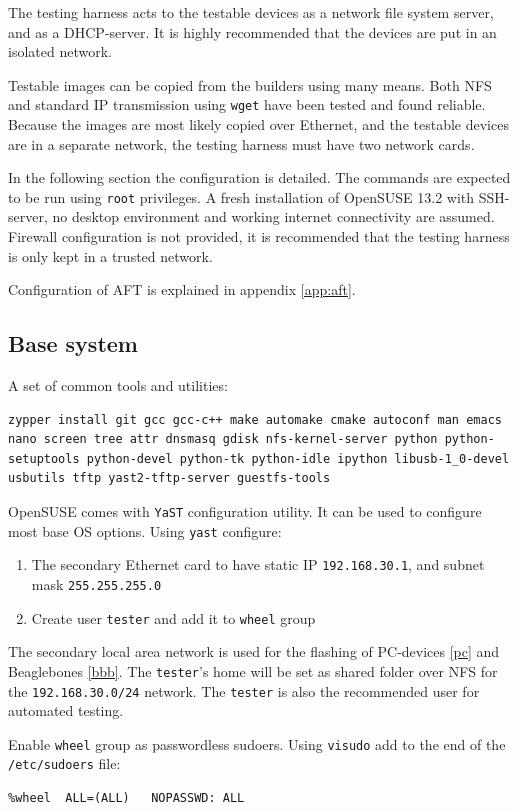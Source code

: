 \documentclass[a4paper,11pt]{article}
\newcommand{\cmd}[1]{\texttt{#1}}
\begin{document}
The testing harness acts to the testable devices as a network file system server, and as a DHCP-server. It is highly recommended that the devices are put in an isolated network.

Testable images can be copied from the builders using many means. Both NFS and standard IP transmission using \cmd{wget} have been tested and found reliable. Because the images are most likely copied over Ethernet, and the testable devices are in a separate network, the testing harness must have two network cards.

In the following section the configuration is detailed. The commands are expected to be run using \cmd{root} privileges. A fresh installation of OpenSUSE 13.2 with SSH-server, no desktop environment and working internet connectivity are assumed. Firewall configuration is not provided, it is recommended that the testing harness is only kept in a trusted network.

Configuration of AFT is explained in appendix \ref{app:aft}.

\subsection*{Base system}
A set of common tools and utilities:
\begin{lstlisting}
zypper install git gcc gcc-c++ make automake cmake autoconf man emacs nano screen tree attr dnsmasq gdisk nfs-kernel-server python python-setuptools python-devel python-tk python-idle ipython libusb-1_0-devel usbutils tftp yast2-tftp-server guestfs-tools
\end{lstlisting}


OpenSUSE comes with \cmd{YaST} configuration utility. It can be used to configure most base OS options. Using \cmd{yast} configure:
\begin{enumerate}
\item The secondary Ethernet card to have static IP \cmd{192.168.30.1}, and subnet mask \cmd{255.255.255.0}
\item Create user \cmd{tester} and add it to \cmd{wheel} group
\end{enumerate}
The secondary local area network is used for the flashing of PC-devices  \ref{pc} and Beaglebones \ref{bbb}. The \cmd{tester}'s  home will be set as shared folder over NFS for the \cmd{192.168.30.0/24} network. The \cmd{tester} is also the recommended user for automated testing.

Enable \cmd{wheel} group as passwordless sudoers. Using \cmd{visudo} add to the end of the \cmd{/etc/sudoers} file:
\begin{lstlisting}
%wheel	ALL=(ALL)	NOPASSWD: ALL
\end{lstlisting}
\end{document}
